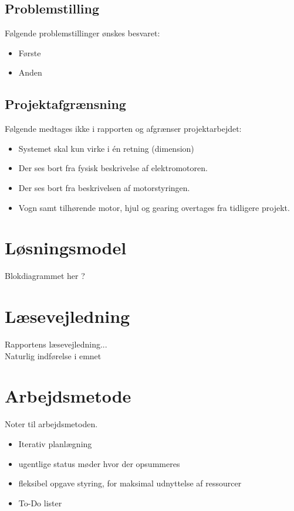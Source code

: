 \subsection{Problemstilling}
Følgende problemstillinger ønskes besvaret:
\begin{itemize}
\item Første
\item Anden
\end{itemize}

\subsection{Projektafgrænsning}
Følgende medtages ikke i rapporten og afgrænser projektarbejdet:
\begin{itemize}
\item Systemet skal kun virke i én retning (dimension)
\item Der ses bort fra fysisk beskrivelse af elektromotoren.
\item Der ses bort fra beskrivelsen af motorstyringen.
\item Vogn samt tilhørende motor, hjul og gearing overtages fra tidligere projekt.
\end{itemize}

\section{Løsningsmodel}
Blokdiagrammet her ?

\section{Læsevejledning}
Rapportens læsevejledning...\\
Naturlig indførelse i emnet

\section{Arbejdsmetode}
Noter til arbejdsmetoden.
\begin{itemize}
	\item Iterativ planlægning
	\item ugentlige status møder hvor der opsummeres
	\item fleksibel opgave styring, for maksimal udnyttelse af ressourcer 
	\item To-Do lister
\end{itemize}

